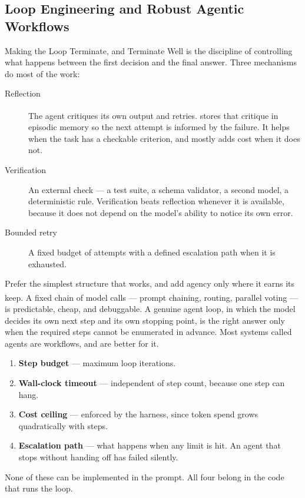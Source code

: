 \subsection{Loop Engineering and Robust Agentic Workflows}

\begin{v3topic}{Making the Loop Terminate, and Terminate Well}
     is the discipline of controlling what happens
    between the first decision and the final answer. Three mechanisms do most
    of the work:

    \begin{description}
      \item[Reflection] The agent critiques its own output and retries.
        \textsuperscript{\cite{shinnReflexionLanguageAgents2023}}
        stores that critique in episodic memory so the next attempt is
        informed by the failure. It helps when the task has a checkable
        criterion, and mostly adds cost when it does not.
      \item[Verification] An external check --- a test suite, a schema
        validator, a second model, a deterministic rule. Verification beats
        reflection whenever it is available, because it does not depend on the
        model's ability to notice its own error.
      \item[Bounded retry] A fixed budget of attempts with a defined
        escalation path when it is exhausted.
    \end{description}

\begin{engineernote}
Prefer the simplest structure that works, and add agency only where it earns
its keep\textsuperscript{\cite{anthropicBuildingEffectiveAgents2026}}. A fixed
chain of model calls --- prompt chaining, routing, parallel voting --- is
predictable, cheap, and debuggable. A genuine agent loop, in which the model
decides its own next step and its own stopping point, is the right answer only
when the required steps cannot be enumerated in advance. Most systems called
agents are workflows, and are better for it.
\end{engineernote}

\begin{cautionbox}
\begin{enumerate}
  \item \textbf{Step budget} --- maximum loop iterations.
  \item \textbf{Wall-clock timeout} --- independent of step count, because one
    step can hang.
  \item \textbf{Cost ceiling} --- enforced by the harness, since token spend
    grows quadratically with steps.
  \item \textbf{Escalation path} --- what happens when any limit is hit. An
    agent that stops without handing off has failed silently.
\end{enumerate}
None of these can be implemented in the prompt. All four belong in the code
that runs the loop.
\end{cautionbox}
\end{v3topic}

